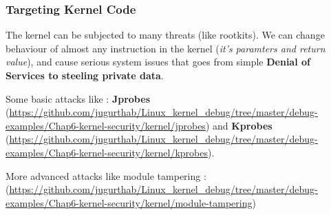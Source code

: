 \begin{center}
\end{center}
\subsubsection{Targeting Kernel Code}
The kernel can be subjected to many threats (like rootkits).
We can change behaviour of almost any instruction in the kernel (\textit{it's paramters and return value}), and cause
serious system issues that goes from simple \textbf{Denial of Services to steeling private data}.

Some basic attacks like : \textbf{Jprobes} ({\color{blue}\url{https://github.com/jugurthab/Linux_kernel_debug/tree/master/debug-examples/Chap6-kernel-security/kernel/jprobes}}) and \textbf{Kprobes} ({\color{blue}\url{https://github.com/jugurthab/Linux\_kernel\_debug/tree/master/debug-examples/Chap6-kernel-security/kernel/kprobes}}).


More advanced attacks like module tampering : ({\color{blue}\url{https://github.com/jugurthab/Linux_kernel_debug/tree/master/debug-examples/Chap6-kernel-security/kernel/module-tampering}})


